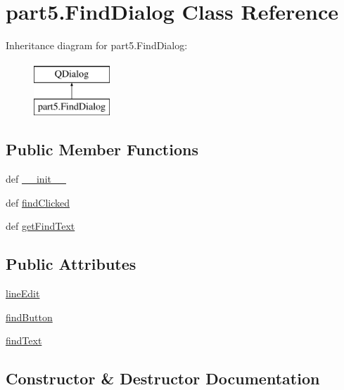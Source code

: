 \hypertarget{classpart5_1_1FindDialog}{}\section{part5.\+Find\+Dialog Class Reference}
\label{classpart5_1_1FindDialog}
Inheritance diagram for part5.\+Find\+Dialog\+:\begin{figure}[H]
\begin{center}
\leavevmode
\includegraphics[height=2.000000cm]{classpart5_1_1FindDialog}
\end{center}
\end{figure}
\subsection*{Public Member Functions}
\begin{DoxyCompactItemize}
\item 
def \hyperlink{classpart5_1_1FindDialog_ac1d20b0982ea2d12926b54b30bd33fcc}{\+\_\+\+\_\+init\+\_\+\+\_\+}
\item 
def \hyperlink{classpart5_1_1FindDialog_a731ab5c50f727c0f1617346b615372b3}{find\+Clicked}
\item 
def \hyperlink{classpart5_1_1FindDialog_a17e00ecc4d20887e5d417b399878cfdb}{get\+Find\+Text}
\end{DoxyCompactItemize}
\subsection*{Public Attributes}
\begin{DoxyCompactItemize}
\item 
\hyperlink{classpart5_1_1FindDialog_a4ded623193cbdfd952055d4094e38304}{line\+Edit}
\item 
\hyperlink{classpart5_1_1FindDialog_abc880dac16b9afe22277eb0f257e3e77}{find\+Button}
\item 
\hyperlink{classpart5_1_1FindDialog_a9206a97ae0d6e691943e70d69b86253a}{find\+Text}
\end{DoxyCompactItemize}


\subsection{Constructor \& Destructor Documentation}
\hypertarget{classpart5_1_1FindDialog_ac1d20b0982ea2d12926b54b30bd33fcc}{}
